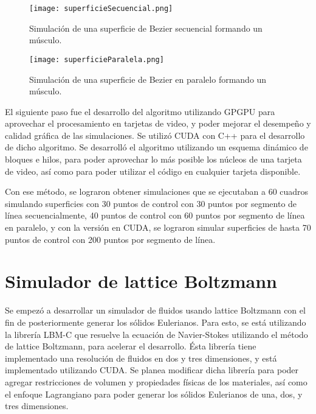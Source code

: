 \begin{figure}[!htb]
	\centering
	\texttt{[image: superficieSecuencial.png]}
  	\caption[Superficie de Bezier secuencial.]{Simulación de una superficie de Bezier secuencial formando un músculo.}
	\label{fig:sequentialSurface}
\endminipage\hfill
{}
	\centering
  	\texttt{[image: superficieParalela.png]}
	\caption[Superficie de Bezier en paralelo.]{Simulación de una superficie de Bezier en paralelo formando un músculo.}
	\label{fig:parallelSurface}
\endminipage\hfill
\end{figure}

El siguiente paso fue el desarrollo del algoritmo utilizando GPGPU para aprovechar el procesamiento en tarjetas de video, y poder mejorar el desempeño y calidad gráfica de las simulaciones. Se utilizó CUDA con C++ para el desarrollo de dicho algoritmo. Se desarrolló el algoritmo utilizando un esquema dinámico de bloques e hilos, para poder aprovechar lo más posible los núcleos de una tarjeta de video, así como para poder utilizar el código en cualquier tarjeta disponible. 

Con ese método, se lograron obtener simulaciones que se ejecutaban a 60 cuadros simulando superficies con 30 puntos de control con 30 puntos por segmento de línea secuencialmente, 40 puntos de control con 60 puntos por segmento de línea en paralelo, y con la versión en CUDA, se lograron simular superficies de hasta 70 puntos de control con 200 puntos por segmento de línea.

\section{Simulador de lattice Boltzmann}

Se empezó a desarrollar un simulador de fluidos usando lattice Boltzmann \citep{lattice2005wolfgladrow} con el fin de posteriormente generar los sólidos Eulerianos. Para esto, se está utilizando la librería LBM-C \citep{lbmc} que resuelve la ecuación de Navier-Stokes utilizando el método de lattice Boltzmann, para acelerar el desarrollo. Ésta librería tiene implementado una resolución de fluidos en dos y tres dimensiones, y está implementado utilizando CUDA. Se planea modificar dicha librería para poder agregar restricciones de volumen y propiedades físicas de los materiales, así como el enfoque Lagrangiano para poder generar los sólidos Eulerianos de una, dos, y tres dimensiones.

